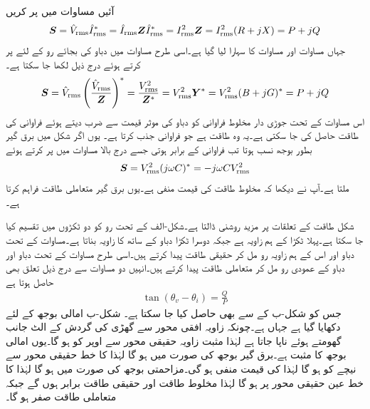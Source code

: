 آئیں مساوات  میں  پر کریں
\begin{align}
{\ensuremath{{\boldsymbol{S}}}}={\hat{V}_{\textup{rms}}}{\hat{I}^{*}_{\textup{rms}}}={\hat{I}_{\textup{rms}}}{{\boldsymbol{Z}}}{\hat{I}^{*}_{\textup{rms}}}={I^2_{\textup{rms}}}{{\boldsymbol{Z}}}={I^2_{\textup{rms}}}(R+jX)=P+jQ
\end{align}
جہاں مساوات  اور مساوات  کا سہارا لیا گیا ہے۔اسی طرح مساوات  میں دباو کی بجائے رو کے لئے پر کرتے ہوئے درج ذیل لکھا جا سکتا ہے۔
\begin{align}
{\ensuremath{{\boldsymbol{S}}}}={\hat{V}_{\textup{rms}}}\left(\frac{{\hat{V}_{\textup{rms}}}}{{{\boldsymbol{Z}}}}\right)^*=\frac{{V^2_{\textup{rms}}}}{{{\boldsymbol{Z}}^{*}}}={V^2_{\textup{rms}}} {{\boldsymbol{Y}}^{*}}={V^2_{\textup{rms}}}(B+jG)^*=P+jQ
\end{align}
اس مساوات کے تحت جوڑی دار مخلوط فراوانی کو دباو کی موثر قیمت سے ضرب دیتے ہوئے فراوانی کی طاقت حاصل کی جا سکتی ہے۔یہ وہ طاقت ہے جو فراوانی جذب کرتا ہے۔  یوں اگر شکل  میں برق گیر بطور بوجھ  نسب ہوتا تب فراوانی  کے برابر ہوتی جسے درج بالا مساوات میں پر کرتے ہوئے
\begin{align}\label{مساوات_طاقت_برق_گیر_مخلوط_طاقت}
{\ensuremath{{\boldsymbol{S}}}}={V^2_{\textup{rms}}} (j\omega C)^*=-j\omega C {V^2_{\textup{rms}}}
\end{align}
ملتا ہے۔آپ نے دیکھا کہ مخلوط طاقت کی قیمت منفی ہے۔یوں برق گیر متعاملی طاقت فراہم کرتا ہے۔

شکل  طاقت کے تعلقات پر  مزید روشنی ڈالتا ہے۔شکل-الف کے تحت رو کو دو ٹکڑوں میں تقسیم کیا جا سکتا ہے۔پہلا ٹکڑا  کے ہم زاویہ ہے جبکہ دوسرا ٹکڑا دباو کے ساتھ  کا زاویہ بناتا ہے۔مساوات  کے تحت دباو اور اس کے ہم زاویہ رو مل کر حقیقی طاقت  پیدا کرتے ہیں۔اسی طرح مساوات  کے تحت دباو اور دباو کے عمودی رو مل کر متعاملی طاقت  پیدا کرتے ہیں۔انہیں دو مساوات سے درج ذیل تعلق بھی حاصل ہوتا ہے
\begin{align}
\tan(\theta_v-\theta_i)=\frac{Q}{P}
\end{align}
جس کو شکل-ب کے  سے بھی حاصل کیا جا سکتا ہے۔
 شکل-ب امالی بوجھ کے لئے دکھایا گیا ہے جہاں  ہے۔چونکہ زاویہ افقی محور سے گھڑی کی گردش کے الٹ جانب گھومتے ہوئے ناپا جاتا ہے لہٰذا مثبت زاویہ حقیقی محور سے اوپر کو ہو گا۔یوں امالی بوجھ کا  مثبت ہے۔برق گیر بوجھ کی صورت میں  ہو گا لہٰذا  کا خط حقیقی محور سے نیچے کو ہو گا لہٰذا  کی قیمت منفی ہو گی۔مزاحمتی بوجھ کی صورت میں  ہو گا لہٰذا  کا خط عین حقیقی محور پر ہو گا لہٰذا مخلوط طاقت اور حقیقی طاقت برابر ہوں گے جبکہ متعاملی طاقت صفر ہو گا۔

